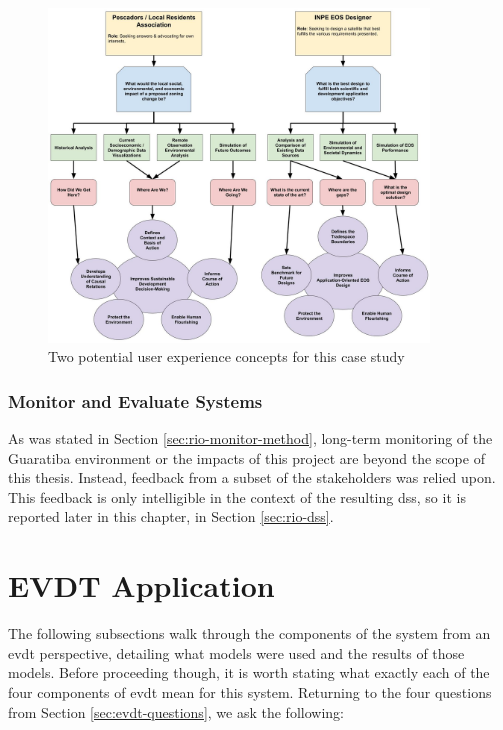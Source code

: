 \begin{figure}[t] 
\centering
\includegraphics[width=0.9\textwidth]{Figures/chap4/concept_flow.jpg}
\caption[Potential user experience concepts for the Rio de Janeiro case study]{Two potential user experience concepts for this case study}
\label{fig:concept_flow}
\end{figure}

\subsubsection{Monitor and Evaluate Systems}

As was stated in Section \ref{sec:rio-monitor-method}, long-term monitoring of the Guaratiba environment or the impacts of this project are beyond the scope of this thesis. Instead, feedback from a subset of the stakeholders was relied upon. This feedback is only intelligible in the context of the resulting \ac{dss}, so it is reported later in this chapter, in Section \ref{sec:rio-dss}.

\section{EVDT Application} \label{sec:rio-evdt}

The following subsections walk through the components of the system from an \acf{evdt} perspective, detailing what models were used and the results of those models. Before proceeding though, it is worth stating what exactly each of the four components of \ac{evdt} mean for this system. Returning to the four questions from Section \ref{sec:evdt-questions}, we ask the following:

